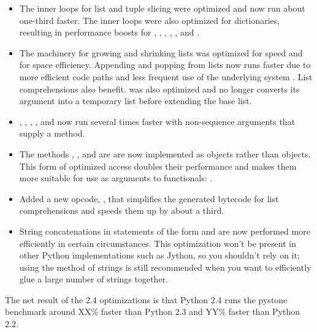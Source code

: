 \documentclass{howto}
\begin{document}
\begin{itemize}

\item The inner loops for list and tuple slicing
 were optimized and now run about one-third faster.  The inner loops
 were also optimized for dictionaries, resulting in performance boosts for
 , , ,
 , , and .

\item The machinery for growing and shrinking lists was optimized for
 speed and for space efficiency.  Appending and popping from lists now
 runs faster due to more efficient code paths and less frequent use of
 the underlying system .  List comprehensions
 also benefit.    was also optimized and no
 longer converts its argument into a temporary list before extending
 the base list.

\item {}, , ,
  , and  now run several times
  faster with non-sequence arguments that supply a 
  method.  

\item The methods ,
  , and  are
  are now implemented as  objects rather
  than  objects.  This form of optimized
  access doubles their performance and makes them more suitable for
  use as arguments to functionals:
  .

\item Added a new opcode, , that simplifies
  the generated bytecode for list comprehensions and speeds them up
  by about a third.

\item String concatenations in statements of the form  and  are now performed more efficiently in
certain circumstances.  This optimization won't be present in other
Python implementations such as Jython, so you shouldn't rely on it;
using the  method of strings is still recommended when
you want to efficiently glue a large number of strings together.

\end{itemize}

The net result of the 2.4 optimizations is that Python 2.4 runs the
pystone benchmark around XX\% faster than Python 2.3 and YY\% faster
than Python 2.2.
\end{document}
